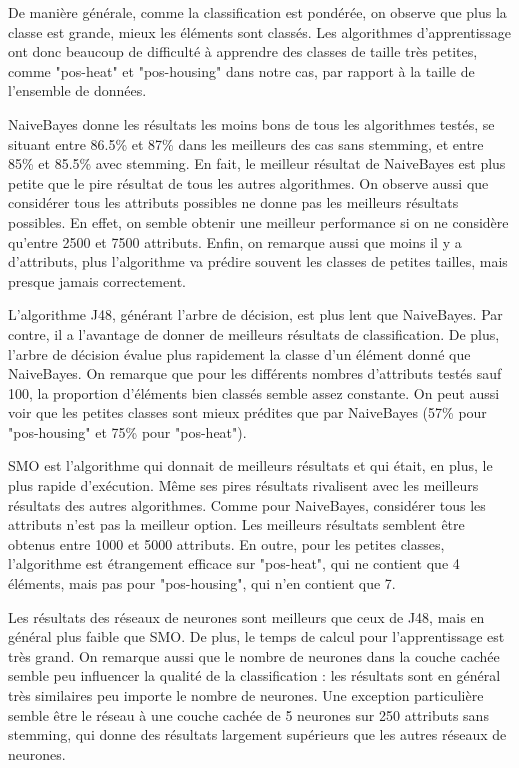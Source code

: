 \documentclass[11pt]{article} %
\begin{document}
De manière générale, comme la classification est pondérée, on observe que plus la classe est grande, mieux les éléments sont classés. Les algorithmes d'apprentissage ont donc beaucoup de difficulté à apprendre des classes de taille très petites, comme "pos-heat" et "pos-housing" dans notre cas, par rapport à la taille de l'ensemble de données.

NaiveBayes donne les résultats les moins bons de tous les algorithmes testés, se situant entre 86.5\% et 87\% dans les meilleurs des cas sans stemming, et entre 85\% et 85.5\% avec stemming. En fait, le meilleur résultat de NaiveBayes est plus petite que le pire résultat de tous les autres algorithmes. On observe aussi que considérer tous les attributs possibles ne donne pas les meilleurs résultats possibles. En effet, on semble obtenir une meilleur performance si on ne considère qu'entre 2500 et 7500 attributs. Enfin, on remarque aussi que moins il y a d'attributs, plus l'algorithme va prédire souvent les classes de petites tailles, mais presque jamais correctement.

L'algorithme J48, générant l'arbre de décision, est plus lent que NaiveBayes. Par contre, il a l'avantage de donner de meilleurs résultats de classification. De plus, l'arbre de décision évalue plus rapidement la classe d'un élément donné que NaiveBayes. On remarque que pour les différents nombres d'attributs testés sauf 100, la proportion d'éléments bien classés semble assez constante. On peut aussi voir que les petites classes sont mieux prédites que par NaiveBayes (57\% pour "pos-housing" et 75\% pour "pos-heat").

SMO est l'algorithme qui donnait de meilleurs résultats et qui était, en plus, le plus rapide d'exécution. Même ses pires résultats rivalisent avec les meilleurs résultats des autres algorithmes. Comme pour NaiveBayes, considérer tous les attributs n'est pas la meilleur option. Les meilleurs résultats semblent être obtenus entre 1000 et 5000 attributs. En outre, pour les petites classes, l'algorithme est étrangement efficace sur "pos-heat", qui ne contient que 4 éléments, mais pas pour "pos-housing", qui n'en contient que 7.

Les résultats des réseaux de neurones sont meilleurs que ceux de J48, mais en général plus faible que SMO. De plus, le temps de calcul pour l'apprentissage est très grand. On remarque aussi que le nombre de neurones dans la couche cachée semble peu influencer la qualité de la classification : les résultats sont en général très similaires peu importe le nombre de neurones. Une exception particulière semble être le réseau à une couche cachée de 5 neurones sur 250 attributs sans stemming, qui donne des résultats largement supérieurs que les autres réseaux de neurones.
\end{document}
